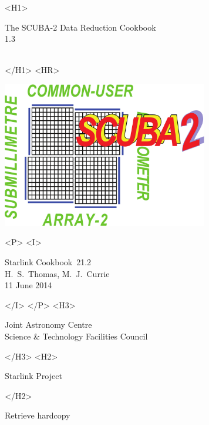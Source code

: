 \documentclass[twoside,11pt]{article}
\newcommand{\stardoccategory}  {Starlink Cookbook}
\newcommand{\stardocsource}    {sc\stardocnumber}
\newcommand{\stardocnumber}    {21.2}
\newcommand{\stardocauthors}   {H.\ S.\ Thomas, M.\ J.\ Currie}
\newcommand{\stardocdate}      {11 June 2014}
\newcommand{\stardoctitle}     {The SCUBA-2 Data Reduction Cookbook}
\newcommand{\stardocversion}   {1.3}
\newcommand{\stardocmanual}    {\ }
\newcommand{\htmladdnormallink}[2]{#1}
\newcommand{\htmladdimg}[1]{}
\newcommand{\xlabel}[1]{}
\renewcommand{\_}{\texttt{\symbol{95}}}
\begin{document}
\begin{htmlonly}
   \xlabel{}
   \begin{rawhtml} <H1> \end{rawhtml}
      \stardoctitle\\
      \stardocversion\\
      \stardocmanual
   \begin{rawhtml} </H1> <HR> \end{rawhtml}

   \includegraphics[width=90mm]{sc21_s2logo}

   \begin{rawhtml} <P> <I> \end{rawhtml}
   \stardoccategory\ \stardocnumber \\
   \stardocauthors \\
   \stardocdate
   \begin{rawhtml} </I> </P> <H3> \end{rawhtml}
      \htmladdnormallink{Joint Astronomy Centre}
                        {http://www.jach.hawaii.edu}\\
      \htmladdnormallink{Science \& Technology Facilities Council}
                        {http://www.scitech.ac.uk} \\
   \begin{rawhtml} </H3> <H2> \end{rawhtml}
      \htmladdnormallink{Starlink Project}{http://www.starlink.ac.uk/}
   \begin{rawhtml} </H2> \end{rawhtml}
   \htmladdnormallink{\htmladdimg{source.gif} Retrieve hardcopy}
      {http://www.starlink.ac.uk/cgi-bin/hcserver?\stardocsource}\\


\end{htmlonly}
\end{document}
